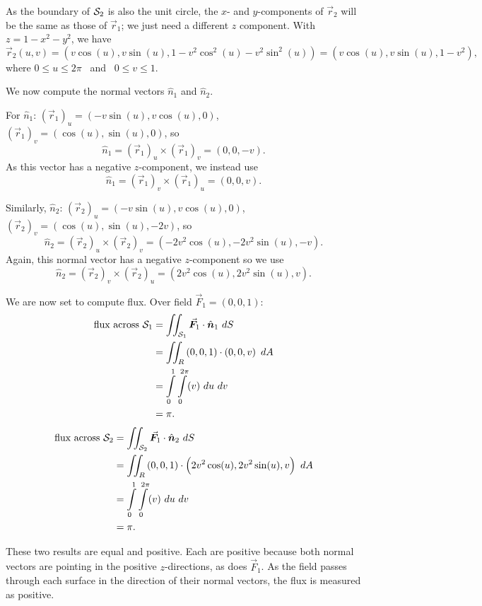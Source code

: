 \begin{example}
As the boundary of $\mathcal{S}_2$ is also the unit circle, the $x$- and $y$-components of $\vec r_2$ will be the same as those of $\vec r_1$; we just need a different $z$ component. With $z = 1-x^2-y^2$, we have
$$\vec r_2(u,v) = \left( v\cos (u),v\sin (u), 1-v^2\cos^2(u)-v^2\sin^2(u)\right) = \left( v\cos (u),v\sin (u), 1-v^2\right),$$
where $0\leq u\leq 2\pi$ \ and \ $0\leq v\leq 1$.

We now compute the normal vectors $\hat n_1$ and $\hat n_2$.

For $\hat n_1$: $\left(\vec r_{1}\right)_u= \left( -v\sin (u), v\cos (u),0\right)$,\  $ \left(\vec r_{1}\right)_v = \left( \cos (u),\sin (u),0\right)$, so
$$\hat n_1 = \left(\vec r_{1}\right)_u\times  \left(\vec r_{1}\right)_v = \left( 0,0,-v\right).$$
As this vector has a negative $z$-component, we instead use
$$\hat n_1 = \left(\vec r_{1}\right)_v\times \left(\vec r_{1}\right)_u = \left( 0,0,v\right).$$

Similarly, $\hat n_2$: $\left(\vec r_{2}\right)_u= \left( -v\sin (u), v\cos (u),0\right)$, \ $\left(\vec r_{2}\right)_v = \left( \cos (u),\sin (u),-2v\right)$, so 
$$\hat n_2 = \left(\vec r_{2}\right)_u\times \left(\vec r_{2}\right)_v = \left( -2v^2\cos (u),-2v^2\sin (u),-v\right).$$ 
Again, this normal vector has a negative $z$-component so we use
$$\hat n_2 = \left(\vec r_{2}\right)_v\times \left(\vec r_{2}\right)_u = \left( 2v^2\cos (u),2v^2\sin (u),v\right).$$ 

We are now set to compute flux. Over field $\vec F_1=\left( 0,0,1\right)$:
\begin{align*}
\text{flux across $\surfaceS_1$} &= \iint_{\surfaceS_1} \vec F_1\cdot \hat n_1\ dS \\
						&= \iint_R\left( 0,0,1\right)\cdot\left( 0,0,v\right)\ dA\\
						&= \int\limits_0^1\int\limits_0^{2\pi} (v)\ du\ dv\\
						&= \pi.
\end{align*}
\begin{align*}
\text{flux across $\surfaceS_2$} &= \iint_{\surfaceS_2} \vec F_1\cdot \hat n_2\ dS \\
						&= \iint_R\left( 0,0,1\right)\cdot\left( 2v^2\cos (u),2v^2\sin (u),v\right)\ dA\\
						&= \int\limits_0^1\int\limits_0^{2\pi} (v)\ du\ dv\\
						&= \pi.
\end{align*}

These two results are equal and positive. Each are positive because both normal vectors are pointing in the positive $z$-directions, as does $\vec F_1$. As the field passes through each surface in the direction of their normal vectors, the flux is measured as positive.


\end{example}
